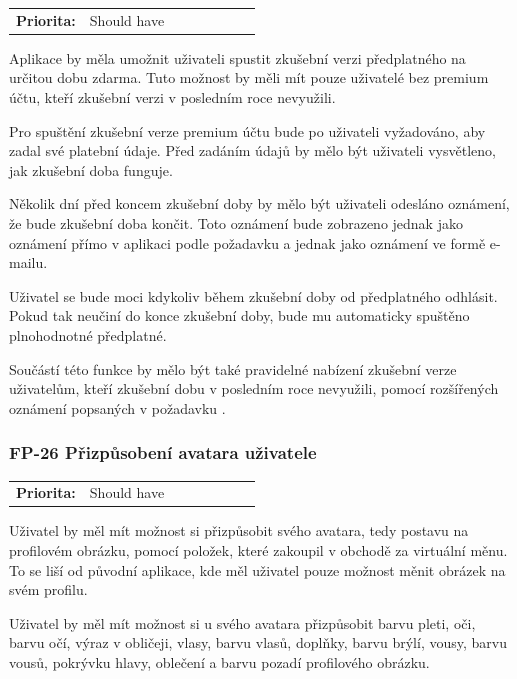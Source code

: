\begin{tabular}{lp{0.7\linewidth}}
    \textbf{Priorita:} & Should have \\
\end{tabular}

Aplikace by měla umožnit uživateli spustit zkušební verzi předplatného na určitou dobu zdarma. Tuto možnost by měli mít pouze uživatelé bez premium účtu, kteří zkušební verzi v posledním roce nevyužili.

Pro spuštění zkušební verze premium účtu bude po uživateli vyžadováno, aby zadal své platební údaje. Před zadáním údajů by mělo být uživateli vysvětleno, jak zkušební doba funguje.

Několik dní před koncem zkušební doby by mělo být uživateli odesláno oznámení, že bude zkušební doba končit. Toto oznámení bude zobrazeno jednak jako oznámení přímo v aplikaci podle požadavku  a jednak jako oznámení ve formě e-mailu.

Uživatel se bude moci kdykoliv během zkušební doby od předplatného odhlásit. Pokud tak neučiní do konce zkušební doby, bude mu automaticky spuštěno plnohodnotné předplatné.

Součástí této funkce by mělo být také pravidelné nabízení zkušební verze uživatelům, kteří zkušební dobu v posledním roce nevyužili, pomocí rozšířených oznámení popsaných v požadavku .

\subsubsection{FP-26 Přizpůsobení avatara uživatele}

\label{sec:fp-avatar-customization}

\begin{tabular}{lp{0.7\linewidth}}
    \textbf{Priorita:} & Should have \\
\end{tabular}

Uživatel by měl mít možnost si přizpůsobit svého avatara, tedy postavu na profilovém obrázku, pomocí položek, které zakoupil v obchodě za virtuální měnu. To se liší od původní aplikace, kde měl uživatel pouze možnost měnit obrázek na svém profilu.

Uživatel by měl mít možnost si u svého avatara přizpůsobit barvu pleti, oči, barvu očí, výraz v obličeji, vlasy, barvu vlasů, doplňky, barvu brýlí, vousy, barvu vousů, pokrývku hlavy, oblečení a barvu pozadí profilového obrázku.

